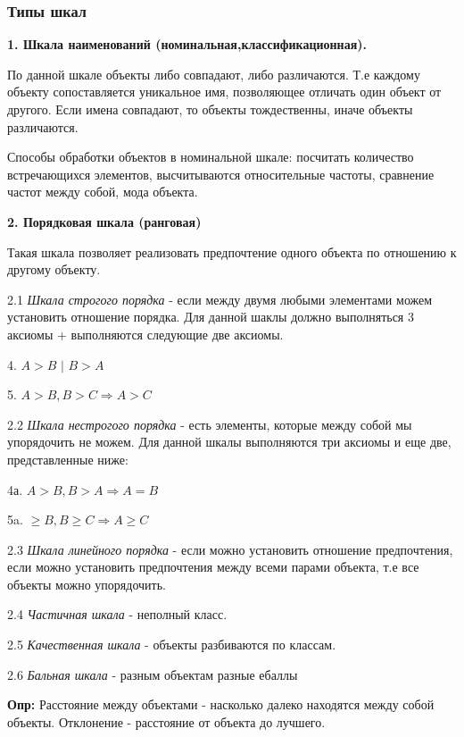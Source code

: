 \documentclass[aps,%
12pt,%
final,%
oneside,
onecolumn,%
musixtex, %
superscriptaddress,%
centertags]{article} %
\begin{document}
\subsubsection{Типы шкал}
\begin{center}
\textbf{1. Шкала наименований (номинальная,классификационная).}
\end{center}

По данной шкале объекты либо совпадают, либо различаются. Т.е каждому объекту сопоставляется уникальное имя, позволяющее отличать один объект от другого. Если имена совпадают, то объекты тождественны, иначе объекты различаются.

Способы обработки объектов в номинальной шкале:
посчитать количество встречающихся элементов, высчитываются относительные частоты, сравнение частот между собой, мода объекта.
\begin{center}
\textbf{2. Порядковая шкала (ранговая) }
\end{center}

Такая шкала позволяет реализовать предпочтение одного объекта по отношению к другому объекту.

2.1 \textit{ Шкала строгого порядка} - если между двумя любыми элементами можем установить отношение порядка. Для данной шаклы должно выполняться 3 аксиомы + выполняются следующие две аксиомы.
\begin{center}
4. $ A>B \text{ | } B>A$ 

5. $ A>B, B>C \Rightarrow A>C $
\end{center}

2.2 \textit{Шкала нестрогого порядка} - есть элементы, которые между собой мы упорядочить не можем. Для данной шкалы выполняются три аксиомы и еще две, представленные ниже:
\begin{center}
4а. $ A>B,B>A \Rightarrow A = B $

5a. $ \geq B, B \geq C \Rightarrow A \geq C $
\end{center}

2.3 \textit{Шкала линейного порядка} - если можно установить отношение предпочтения, если можно установить предпочтения между всеми парами объекта, т.е все объекты можно упорядочить.

2.4 \textit{Частичная шкала} - неполный класс.

2.5 \textit{Качественная шкала} - объекты разбиваются по классам.

2.6 \textit{Бальная шкала} - разным объектам разные ебаллы

\textbf{Опр:} Расстояние между объектами - насколько далеко находятся между собой объекты. Отклонение - расстояние от объекта до лучшего.
\end{document}
